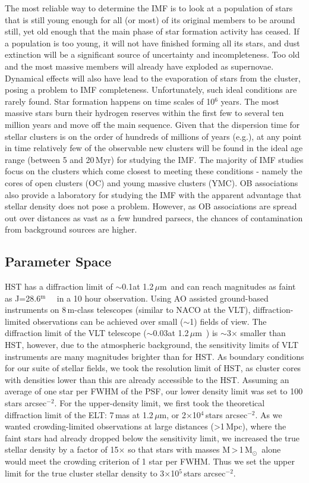 \documentclass[referee]{aa}
\newcommand{\m}{$^\mathrm{m}$~}
\newcommand{\um}{$\mu$m~}
\newcommand{\ume}{$\mu$m}
\newcommand{\msun}{M$_\odot$~}
\newcommand{\s}{$\sim$}
\newcommand{\h}[1]{$^{#1}$}
\newcommand{\spae}{stars arcsec$^{-2}$}
\begin{document}
The most reliable way to determine the IMF is to look at a population of stars that is still young enough for all (or most) of its original members to be around still, yet old enough that the main phase of star formation activity has ceased.
If a population is too young, it will not have finished forming all its stars, and dust extinction will be a significant source of uncertainty and incompleteness.
  Too old and the most massive members will already have exploded as supernovae.
Dynamical effects will also have lead to the evaporation of stars from the cluster, posing a problem to IMF completeness.
Unfortunately, such ideal conditions are rarely found.
Star formation happens on time scales of 10\h6 years.
The most massive stars burn their hydrogen reserves within the first few to several ten million years and move off the main sequence.
Given that the dispersion time for stellar clusters is on the order of hundreds of millions of years (e.g.\~\citealt{Lada2003-ip}), at any point in time relatively few of the observable new clusters will be found in the ideal age range (between 5 and 20\,Myr) for studying the IMF\@.
The majority of IMF studies focus on the clusters which come closest to meeting these conditions - namely the cores of open clusters (OC) and young massive clusters (YMC).
OB associations also provide a laboratory for studying the IMF with the apparent advantage that stellar density does not pose a problem.
However, as OB associations are spread out over distances as vast as a few hundred parsecs, the chances of contamination from background sources are higher.


\subsection{Parameter Space}
\label{subsec:parameter_space}

HST has a diffraction limit of \s0.1\arcsec at 1.2\,\um and can reach magnitudes as faint as J=28.6\m~\citep{hst_wfc3} in a 10 hour observation.
Using AO assisted ground-based instruments on 8\,m-class telescopes (similar to NACO at the VLT), diffraction-limited observations can be achieved over small (\s1\arcmin) fields of view.
The diffraction limit of the VLT telescope (\s0.03\arcsec at 1.2\,\um) is \s3$\times$ smaller than HST, however, due to the atmospheric background, the sensitivity limits of VLT instruments are many magnitudes brighter than for HST\@.
As boundary conditions for our suite of stellar fields, we took the resolution limit of HST, as cluster cores with densities lower than this are already accessible to the HST\@.
Assuming an average of one star per FWHM of the PSF, our lower density limit was set to 100\,\spae.
For the upper-density limit, we first took the theoretical diffraction limit of the ELT: 7\,mas at 1.2\,\ume, or 2$\times$10\h4\,\spae.
As we wanted crowding-limited observations at large distances (\textgreater1\,Mpc), where the faint stars had already dropped below the sensitivity limit, we increased the true stellar density by a factor of 15$\times$ so that stars with masses M\,\textgreater\,1\,\msun alone would meet the crowding criterion of 1 star per FWHM\@.
Thus we set the upper limit for the true cluster stellar density to 3$\times$10\h5\,\spae.
\end{document}
